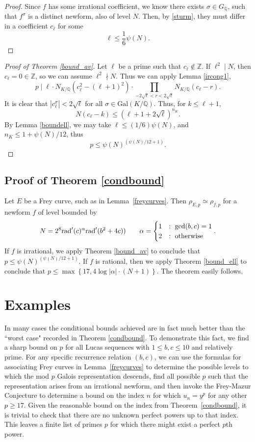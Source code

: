 \documentclass[12pt]{amsart}
\theoremstyle{definition}
\theoremstyle{remark}
\def\Q{{\mathbb Q}}
\def\Z{{\mathbb Z}}
\newcommand{\rad}{{\rm{rad}}}
\newcommand{\notdiv}{\nmid}
\newcommand{\Gal}{\text{Gal}}
\begin{document}
\begin{proof}
Since $f$ has some irrational coefficient, we know there exists $\sigma \in G_\Q$, such that $f^{\sigma}$ is a distinct newform, also of level $N$.  Then, by \ref{sturm}, they must differ in a coefficient $c_\ell$ for some 
\[ \ell \leq \frac{1}{6} \psi(N). \]
\end{proof}

\begin{proof}[Proof of Theorem \ref{bound_av}]
Let $\ell$ be a prime such that $c_\ell \notin \Z$.  If $\ell^2 \mid N$, then $c_\ell = 0 \in \Z$, so we can assume $\ell^2 \notdiv N$. Thus we can apply Lemma \ref{ircong1}, 
\[ p \mid \ell \cdot N_{K / \mathbb{Q}}(c_\ell^2-(\ell+1)^2) \cdot \prod_{-2\sqrt{\ell} < r < 2\sqrt{\ell}}{N_{K / \mathbb{Q}}}(c_\ell - r).\]
It is clear that $|c_\ell^{\sigma}| < 2\sqrt{\ell}$ for all $\sigma \in \Gal(K/\Q)$. Thus, for $k \leq \ell+1$, \[N(c_\ell - k) \leq (\ell+1 + 2\sqrt{\ell})^{n_{K}}.\] 
By Lemma \ref{boundell}, we may take $\ell \leq (1/6)\psi(N)$, and $n_{K} \leq 1+\psi(N)/12$, thus
\[ p \leq \psi(N)^{(\psi(N)/12+1)}. \]
\end{proof}
 
 
 \subsection{Proof of Theorem \ref{condbound}}
 Let $E$ be a Frey curve, such as in Lemma~\ref{freycurves}.  Then $\rho_{E,p} \simeq \rho_{f,p}$ for a newform $f$ of level bounded by 
 \[ N = 2^8  {\rad}'(c)^\alpha\rad'(b^2+4c)) \qquad \alpha = \begin{cases} 1 & : \ \gcd(b,c)=1 \\ 2 & : \ \text{otherwise} \end{cases}. \]
 If $f$ is irrational, we apply Theorem \ref{bound_av} to conclude that $p \leq \psi(N)^{(\psi(N)/12+1)}$.
 If $f$ is rational, then we apply Theorem \ref{bound_ell} to conclude that $p \leq \max\left\{ 17, 4 \log|\alpha| \cdot (N+1) \right\}$. 
 The theorem easily follows.

 
\section{Examples}\label{examples}

In many cases the conditional bounds achieved are in fact much better than the ``worst case" recorded in Theorem \ref{condbound}.   To demonstrate this fact, we find a sharp bound on $p$ for all Lucas sequences with $1 \leq b,c \leq 10$ and relatively prime. For any specific recurrence relation $(b,c)$, we can use the formulas for associating Frey curves in Lemma~\ref{freycurves} to determine the possible levels to which the mod $p$ Galois representation descends, find all possible $p$ such that the representation arises from an irrational newform, and then invoke the Frey-Mazur Conjecture to determine a bound on the index $n$ for which $u_n=y^p$ for any other $p \geq 17$.  Given the reasonable bound on the index from Theorem~\ref{condbound}, it is trivial to check that there are no unknown perfect powers up to that index.  This leaves a finite list of primes $p$ for which there might exist a perfect $p$th power.
\end{document}

